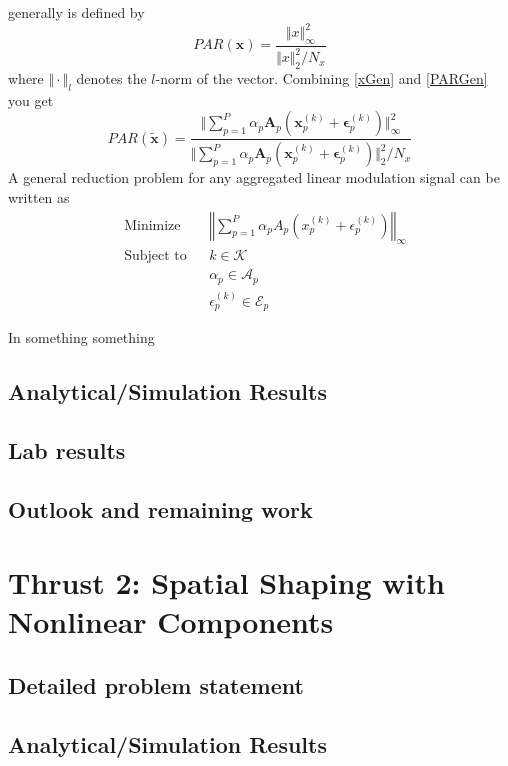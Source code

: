 \documentclass[11pt,onecolumn]{IEEEtran}
\begin{document}
\PAR generally is defined by
\begin{equation}
PAR(\mathbf{x})=\frac{\Vert x \Vert^2_\infty}{\Vert x \Vert^2_2/N_x}
\label{PARGen}
\end{equation}
where $\Vert\cdot\Vert_l$ denotes the $l$-norm of the vector.  Combining \eqref{xGen} and \eqref{PARGen} you get
\begin{equation}
PAR(\mathbf{\tilde{x}})=\frac{\Vert \sum_{p=1}^P\alpha_p\mathbf{A}_p\left(\mathbf{x}_p^{(k)}+\mathbf{\epsilon}_p^{(k)}\right) \Vert^2_\infty}{\Vert \sum_{p=1}^P\alpha_p\mathbf{A}_p\left(\mathbf{x}_p^{(k)}+\mathbf{\epsilon}_p^{(k)}\right) \Vert^2_2/N_x}
\end{equation}
A general \PAR reduction problem for any aggregated linear modulation signal can be written as
\begin{equation}
     \begin{aligned}
      &\text{Minimize } & &\left\Vert\sum_{p=1}^P\alpha_pA_p\left(x_p^{(k)}+\epsilon_p^{(k)}\right)\right\Vert_\infty  \\
      &\text{Subject to} &  &k\in \mathcal{K} \\
      & & &\alpha_p\in\mathcal{A}_p\\
      & & &\epsilon_p^{(k)}\in\mathcal{E}_p 
     \end{aligned}
\end{equation}


In \cite{seung05} something something
\subsection{Analytical/Simulation Results}
\subsection{Lab results}
\subsection{Outlook and remaining work}
\section{Thrust 2:  Spatial Shaping with Nonlinear Components}
\subsection{Detailed problem statement}
\subsection{Analytical/Simulation Results}
\end{document}
